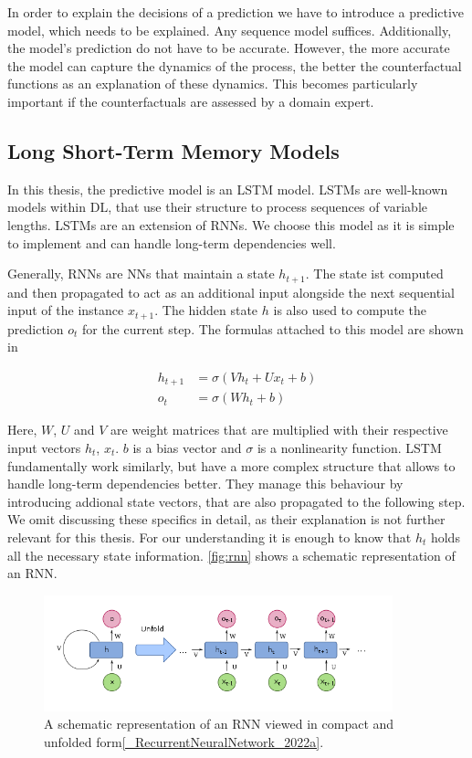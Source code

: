 \documentclass[./../../paper.tex]{subfiles}
\begin{document}
In order to explain the decisions of a prediction we have to introduce a predictive model, which needs to be explained. Any sequence model suffices. Additionally, the model's prediction do not have to be accurate. However, the more accurate the model can capture the dynamics of the process, the better the counterfactual functions as an explanation of these dynamics. This becomes particularly important if the counterfactuals are assessed by a domain expert. 

\subsection{Long Short-Term Memory Models}
In this thesis, the predictive model is an \gls{LSTM} model. LSTMs are well-known models within \gls{DL}, that use their structure to process sequences of variable lengths\autocite{hochreiter_LongShortTermMemory_1997}. LSTMs are an extension of \glspl{RNN}. We choose this model as it is simple to implement and can handle long-term dependencies well.

Generally, \glspl{RNN} are \glspl{NN} that maintain a state $h_{t+1}$. The state ist computed and then propagated to act as an additional input alongside the next sequential input of the instance $x_{t+1}$. The hidden state $h$ is also used to compute the prediction $o_{t}$ for the current step. The formulas attached to this model are shown in 

\begin{align}
    \label{eq:rnn}
    h_{t+1} &= \sigma(V h_t + U x_t + b)\\
    o_{t} &= \sigma(W h_t + b)
\end{align}

Here, $W$, $U$ and $V$ are weight matrices that are multiplied with their respective input vectors $h_t$, $x_t$. $b$ is a bias vector and $\sigma$ is a nonlinearity function. LSTM fundamentally work similarly, but have a more complex structure that allows to handle long-term dependencies better. They manage this behaviour by introducing addional state vectors, that are also propagated to the following step. We omit discussing these specifics in detail, as their explanation is not further relevant for this thesis. For our understanding it is enough to know that $h_t$ holds all the necessary state information. \autoref{fig:rnn} shows a schematic representation of an RNN.   

\begin{figure}[htb]
    \label{fig:rnn}
    \centering
    \includegraphics[width=0.9\textwidth]{figures/rnn.png}
    \caption{A schematic representation of an RNN viewed in compact and unfolded form\autoref{_RecurrentNeuralNetwork_2022a}.}
\end{figure}
\end{document}
